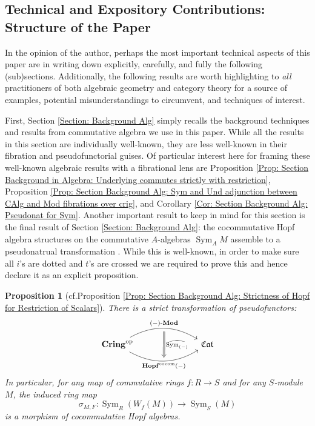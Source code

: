 \documentclass{amsart}
\newtheorem{propx}[thmx]{Proposition}
\theoremstyle{definition}
\DeclareMathOperator{\sym}{Sym}
\DeclareMathOperator{\Cring}{\mathbf{Cring}}
\DeclareMathOperator{\fCat}{\mathfrak{Cat}}
\DeclareMathOperator{\op}{op}
\newcommand{\Sym}[1]{\sym_{#1}}
\newcommand{\Mod}[1]{{#1}\textnormal{-}\mathbf{Mod}}
\numberwithin{equation}{subsection}
\begin{document}
\subsection{Technical and Expository Contributions: Structure of the Paper}
In the opinion of the author, perhaps the most important technical aspects of this paper are in writing down explicitly, carefully, and fully the following (sub)sections. Additionally, the following results are worth highlighting to \emph{all} practitioners of both algebraic geometry and category theory for a source of examples, potential misunderstandings to circumvent, and techniques of interest.

First, Section \ref{Section: Background Alg} simply recalls the background techniques and results from commutative algebra we use in this paper. While all the results in this section are individually well-known, they are less well-known in their fibration and pseudofunctorial guises. Of particular interest here for framing these well-known algebraic results with a fibrational lens are Proposition \ref{Prop: Section Background in Algebra: Underlying commutes strictly with restriction}, Proposition \ref{Prop: Section Background Alg: Sym and Und adjunction between CAlg and Mod fibrations over crig}, and Corollary \ref{Cor: Section Background Alg: Pseudonat for Sym}. Another important result to keep in mind for this section is the final result of Section \ref{Section: Background Alg}: the cocommutative Hopf algebra structures on the commutative $A$-algebras $\Sym{A}{M}$ assemble to a pseudonatrual transformation . While this is well-known, in order to make sure all $i$'s are dotted and $t$'s are crossed we are required to prove this and hence declare it as an explicit proposition.

\begin{propx}[{cf.\@ Proposition \ref{Prop: Section Background Alg: Strictness of Hopf for Restriction of Scalars}}]
There is a strict transformation of pseudofunctors:
\[
\begin{tikzcd}
	\Cring^{\op} \ar[rrr, bend left = 30, ""{name = U}]{}{\Mod{(-)}} \ar[rrr, bend right = 30, swap, ""{name = D}]{}{\mathbf{Hopf}^{\operatorname{cocom}}(-)} & & & \fCat
	\ar[from = U, to = D, Rightarrow, shorten <= 4pt, shorten >= 4pt]{}{\widehat{\Sym{(-)}}}
\end{tikzcd}
\]
In particular, for any map of commutative rings $f:R \to S$ and for any $S$-module $M$, the induced ring map
\[
\sigma_{M,F}:\Sym{R}(W_f(M)) \to \Sym{S}(M)
\]
is a morphism of cocommutative Hopf algebras.
\end{propx}
\end{document}
